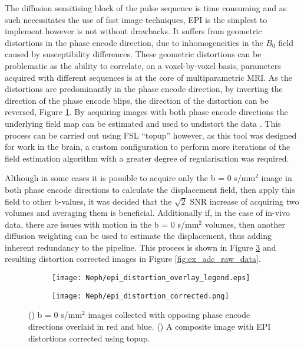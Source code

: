 The diffusion sensitising block of the pulse sequence is time consuming and as such necessitates the use of fast image techniques, \ac{EPI} is the simplest to implement however is not without drawbacks. It suffers from geometric distortions in the phase encode direction, due to inhomogeneities in the $B_0$ field caused by susceptibility differences. These geometric distortions can be problematic as the ability to correlate, on a voxel-by-voxel basis, parameters acquired with different sequences is at the core of multiparametric \ac{MRI}. As the distortions are predominantly in the phase encode direction, by inverting the direction of the phase encode blips, the direction of the distortion can be reversed, Figure \ref{fig:ex_epi_distortion_overlay}. By acquiring images with both phase encode directions the underlying field map can be estimated and used to undistort the data \cite{andersson_how_2003}. This process can be carried out using \ac{FSL} ``topup'' however, as this tool was designed for work in the brain, a custom configuration to perform more iterations of the field estimation algorithm with a greater degree of regularisation was required. 

Although in some cases it is possible to acquire only the b = 0 s/mm$^2$ image in both phase encode directions to calculate the displacement field, then apply this field to other b-values, it was decided that the $\sqrt{2}$ \ac{SNR} increase of acquiring two volumes and averaging them is beneficial. Additionally if, in the case of in-vivo data, there are issues with motion in the b = 0 s/mm$^2$ volumes, then another diffusion weighting can be used to estimate the displacement, thus adding inherent redundancy to the pipeline. This process is shown in Figure \ref{fig:ex_epi_distortion} and resulting distortion corrected images in Figure \ref{fig:ex_adc_raw_data}.

\begin{figure}[H]
	\centering
	\begin{subfigure}[c]{0.47\textwidth}
		\centering
		\texttt{[image: Neph/epi\_distortion\_overlay\_legend.eps]}
		\caption{}
		\label{fig:ex_epi_distortion_overlay}
	\end{subfigure}
	\hfill
	\begin{subfigure}[c]{0.47\textwidth}
		\centering
		\texttt{[image: Neph/epi\_distortion\_corrected.png]}
		\caption{}
		\label{fig:ex_epi_distortion_corrected}
	\end{subfigure}
	\caption{() b = 0 s/mm$^2$ images collected with opposing phase encode directions overlaid in red and blue. () A composite image with \ac{EPI} distortions corrected using topup.}
	\label{fig:ex_epi_distortion}
\end{figure}

